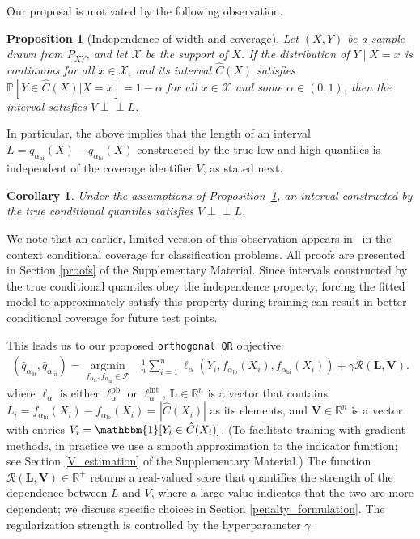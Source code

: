 \documentclass{article}
\newcommand{\indep}{\perp \!\!\! \perp}
\newtheorem{corollary}{Corollary}%
\newtheorem{proposition}{Proposition}
\begin{document}
Our proposal is motivated by the following observation.


\begin{proposition}[Independence of width and coverage]\label{prop:independence_theorem}
Let $(X,Y)$ be a sample drawn from $P_{XY}$, and let $\mathcal{X}$ be the support of $X$. If the distribution of $Y \mid X = x$ is continuous for all $x \in \mathcal{X}$, and its interval $\hat{C}(X)$ satisfies $\mathbb{P}[Y\in \hat{C}(X)|X=x]=1-\alpha$ for all $x \in \mathcal{X}$ and some $\alpha \in (0,1)$, then the interval satisfies $V \indep L$.
\end{proposition}
In particular, the above implies that the length of an interval $L = q_{\alpha_{\textrm{hi}}}(X) - q_{\alpha_{\textrm{lo}}}(X)$ constructed by the true low and high quantiles is independent of the coverage identifier $V$, as stated next.


\begin{corollary}\label{cor:quantile_indp}
Under the assumptions of Proposition~\ref{prop:independence_theorem}, an interval constructed by the true conditional quantiles satisfies $V \indep L$.
\end{corollary}
We note that an earlier, limited version of this observation appears in~\cite{angelopoulos2020uncertainty} in the context conditional coverage for classification problems.
All proofs are presented in Section \ref{proofs} of the Supplementary Material. Since intervals constructed by the true conditional quantiles obey the independence property, forcing the fitted model to approximately satisfy this property during training can result in better conditional coverage for future test points.


This leads us to our proposed \texttt{orthogonal QR} objective:
\begin{equation}\label{eq:quantile_regression_optimization_reg}
\begin{gathered}
(\hat{q}_{\alpha_{\textrm{lo}}}, \hat{q}_{\alpha_{\textrm{hi}}}) = \operatorname*{argmin}_{f_{\alpha_{\textrm{lo}}}, f_{\alpha_{\textrm{hi}}} \in \mathcal{F}} \ \ \ {\frac{1}{n}{\sum_{i=1}^{n} {\ell_{\alpha}(Y_i,f_{\alpha_{\textrm{lo}}}(X_i), f_{\alpha_{\textrm{hi}}}(X_i))}}} + \gamma \mathcal{R}({\mathbf{L}}, {\mathbf{V}}).
\end{gathered}
\end{equation}
where $\ell_{\alpha}$ is either $\ell^\textrm{pb}_{\alpha}$ or $\ell^\textrm{int}_{\alpha}$, $\mathbf{L} \in \mathbb{R}^n$ is a vector that contains $L_i = f_{\alpha_{\textrm{hi}}}(X_i) - f_{\alpha_{\textrm{lo}}}(X_i) = |\hat{C}(X_i)|$ as its elements, and $\mathbf{V} \in \mathbb{R}^n$ is a vector with entries $V_i  = \mathbbm{1}[Y_i \in  \hat{C}(X_i)]$. (To facilitate training with gradient methods, in practice we use a smooth approximation to the indicator function; see Section \ref{V_estimation} of the Supplementary Material.) The function $\mathcal{R}({\mathbf{L}}, {\mathbf{V}})\in \mathbb{R}^+$ returns a real-valued score that quantifies the strength of the dependence between ${L}$ and ${V}$, where a large value indicates that the two are more dependent; we discuss specific choices in Section \ref{penalty_formulation}. The regularization strength is controlled by the hyperparameter $\gamma$. 
\end{document}
